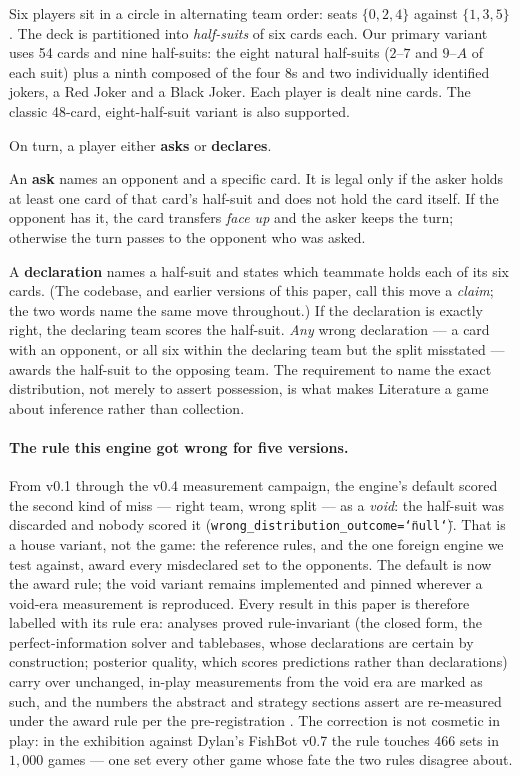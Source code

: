 \documentclass[11pt,a4paper]{article}
\begin{document}
Six players sit in a circle in alternating team order: seats $\{0,2,4\}$
against $\{1,3,5\}$. The deck is partitioned into \emph{half-suits} of six
cards each. Our primary variant uses 54 cards and nine half-suits: the eight
natural half-suits ($2$--$7$ and $9$--$A$ of each suit) plus a ninth composed
of the four $8$s and two individually identified jokers, a Red Joker and a
Black Joker. Each player is dealt nine cards. The classic 48-card,
eight-half-suit variant is also supported.

On turn, a player either \textbf{asks} or \textbf{declares}.

An \textbf{ask} names an opponent and a specific card. It is legal only if the
asker holds at least one card of that card's half-suit and does not hold the
card itself. If the opponent has it, the card transfers \emph{face up} and the
asker keeps the turn; otherwise the turn passes to the opponent who was asked.

A \textbf{declaration} names a half-suit and states which teammate holds each
of its six cards. (The codebase, and earlier versions of this paper, call
this move a \emph{claim}; the two words name the same move throughout.) If
the declaration is exactly right, the declaring team scores the half-suit.
\emph{Any} wrong declaration --- a card with an opponent, or all six within
the declaring team but the split misstated --- awards the half-suit to the
opposing team. The requirement to name the exact distribution, not merely to
assert possession, is what makes Literature a game about inference rather
than collection.

\paragraph{The rule this engine got wrong for five versions.} From v0.1
through the v0.4 measurement campaign, the engine's default scored the
second kind of miss --- right team, wrong split --- as a \emph{void}: the
half-suit was discarded and nobody scored it
(\texttt{wrong\_distribution\_outcome=\char`\"null\char`\"}). That is a house
variant, not the game: the reference rules, and the one foreign engine we
test against, award every misdeclared set to the opponents. The default is
now the award rule; the void variant remains implemented and pinned wherever
a void-era measurement is reproduced. Every result in this paper is
therefore labelled with its rule era: analyses proved rule-invariant
(the closed form, the perfect-information solver and tablebases, whose
declarations are certain by construction; posterior quality, which scores
predictions rather than declarations) carry over unchanged, in-play
measurements from the void era are marked as such, and the numbers the
abstract and strategy sections assert are re-measured under the award rule
per the pre-registration . The
correction is not cosmetic in play: in the exhibition against Dylan's
FishBot v0.7 the rule touches $466$ sets in $1{,}000$ games --- one set
every other game whose fate the two rules disagree about.
\end{document}
